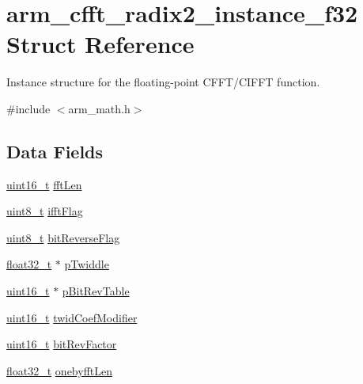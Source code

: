 \hypertarget{structarm__cfft__radix2__instance__f32}{\section{arm\-\_\-cfft\-\_\-radix2\-\_\-instance\-\_\-f32 Struct Reference}
\label{structarm__cfft__radix2__instance__f32}
}


Instance structure for the floating-\/point C\-F\-F\-T/\-C\-I\-F\-F\-T function.  




{\ttfamily \#include $<$arm\-\_\-math.\-h$>$}

\subsection*{Data Fields}
\begin{DoxyCompactItemize}
\item 
\hyperlink{stdint_8h_a273cf69d639a59973b6019625df33e30}{uint16\-\_\-t} \hyperlink{structarm__cfft__radix2__instance__f32_a2f915a1c29635c1623086aaaa726be8f}{fft\-Len}
\item 
\hyperlink{stdint_8h_aba7bc1797add20fe3efdf37ced1182c5}{uint8\-\_\-t} \hyperlink{structarm__cfft__radix2__instance__f32_a8dbe98d2c924e35e0a3fed2fe948176f}{ifft\-Flag}
\item 
\hyperlink{stdint_8h_aba7bc1797add20fe3efdf37ced1182c5}{uint8\-\_\-t} \hyperlink{structarm__cfft__radix2__instance__f32_af713b4ac5256a19bc965c89fe3005fa3}{bit\-Reverse\-Flag}
\item 
\hyperlink{arm__math_8h_a4611b605e45ab401f02cab15c5e38715}{float32\-\_\-t} $\ast$ \hyperlink{structarm__cfft__radix2__instance__f32_adb0c9d47dbfbd90a6f6ed0a05313a974}{p\-Twiddle}
\item 
\hyperlink{stdint_8h_a273cf69d639a59973b6019625df33e30}{uint16\-\_\-t} $\ast$ \hyperlink{structarm__cfft__radix2__instance__f32_a92b8fa0a151cd800436094903a5ca0a4}{p\-Bit\-Rev\-Table}
\item 
\hyperlink{stdint_8h_a273cf69d639a59973b6019625df33e30}{uint16\-\_\-t} \hyperlink{structarm__cfft__radix2__instance__f32_a411f75b6ed01690293f4f5988030ea42}{twid\-Coef\-Modifier}
\item 
\hyperlink{stdint_8h_a273cf69d639a59973b6019625df33e30}{uint16\-\_\-t} \hyperlink{structarm__cfft__radix2__instance__f32_ac1688dafa5177f6b1505abbfd0cf8b21}{bit\-Rev\-Factor}
\item 
\hyperlink{arm__math_8h_a4611b605e45ab401f02cab15c5e38715}{float32\-\_\-t} \hyperlink{structarm__cfft__radix2__instance__f32_a1d3d289d47443e597d88a40effd14b8f}{onebyfft\-Len}
\end{DoxyCompactItemize}


